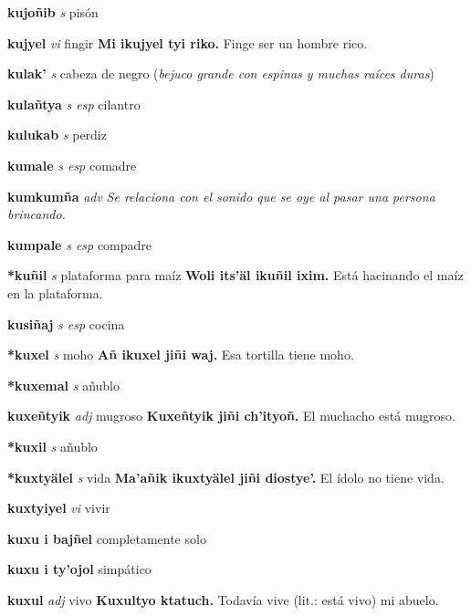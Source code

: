 \documentclass[10pt]{scrbook}
\newcommand{\entry}[1]{\textbf{#1}}
\newcommand{\nontranslationdef}[1]{\textit{#1}}
\newcommand{\partofspeech}[1]{\textit{#1}}
\newcommand{\spanishtranslation}[1]{#1}
\newcommand{\clarification}[1]{(\textit{#1})}
\newcommand{\cholexample}[1]{\textbf{#1}}
\newcommand{\exampletranslation}[1]{#1}
\begin{document}
\begin{multicols}{2}
\entry{kujoñib}
\partofspeech{s}
\spanishtranslation{pisón}

\entry{kujyel}
\partofspeech{vi}
\spanishtranslation{fingir}
\cholexample{Mi ikujyel tyi riko.}
\exampletranslation{Finge ser un hombre rico.}

\entry{kulak'}
\partofspeech{s}
\spanishtranslation{cabeza de negro}
\clarification{bejuco grande con espinas y muchas raíces duras}

\entry{kulañtya}
\partofspeech{s esp}
\spanishtranslation{cilantro}

\entry{kulukab}
\partofspeech{s}
\spanishtranslation{perdiz}

\entry{kumale}
\partofspeech{s esp}
\spanishtranslation{comadre}

\entry{kumkumña}
\partofspeech{adv}
\nontranslationdef{Se relaciona con el sonido que se oye al pasar una persona brincando.}

\entry{kumpale}
\partofspeech{s esp}
\spanishtranslation{compadre}

\entry{*kuñil}
\partofspeech{s}
\spanishtranslation{plataforma para maíz}
\cholexample{Woli its'äl ikuñil ixim.}
\exampletranslation{Está hacinando el maíz en la plataforma.}

\entry{kusiñaj}
\partofspeech{s esp}
\spanishtranslation{cocina}

\entry{*kuxel}
\partofspeech{s}
\spanishtranslation{moho}
\cholexample{Añ ikuxel jiñi waj.}
\exampletranslation{Esa tortilla tiene moho.}

\entry{*kuxemal}
\partofspeech{s}
\spanishtranslation{añublo}

\entry{kuxeñtyik}
\partofspeech{adj}
\spanishtranslation{mugroso}
\cholexample{Kuxeñtyik jiñi ch'ityoñ.}
\exampletranslation{El muchacho está mugroso.}

\entry{*kuxil}
\partofspeech{s}
\spanishtranslation{añublo}

\entry{*kuxtyälel}
\partofspeech{s}
\spanishtranslation{vida}
\cholexample{Ma'añik ikuxtyälel jiñi diostye'.}
\exampletranslation{El ídolo no tiene vida.}

\entry{kuxtyiyel}
\partofspeech{vi}
\spanishtranslation{vivir}

\entry{kuxu i bajñel}
\spanishtranslation{completamente solo}

\entry{kuxu i ty'ojol}
\spanishtranslation{simpático}

\entry{kuxul}
\partofspeech{adj}
\spanishtranslation{vivo}
\cholexample{Kuxultyo ktatuch.}
\exampletranslation{Todavía vive (lit.: está vivo) mi abuelo.}


\end{multicols}
\end{document}
